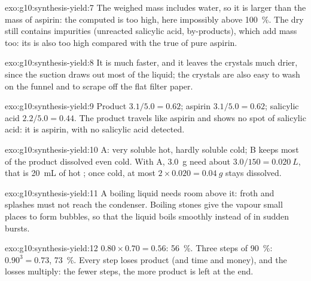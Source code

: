 \begin{solution}{exo:g10:synthesis-yield:7}
The weighed mass includes water, so it is larger than the mass of
aspirin: the computed  is too high, here impossibly above
\qty{100}{\percent}. The dry  still contains impurities
(unreacted salicylic acid, by-products), which add mass too: its 
is also too high compared with the true  of pure aspirin.
\end{solution}

\begin{solution}{exo:g10:synthesis-yield:8}
It is much faster, and it leaves the crystals much drier, since the
suction draws out most of the liquid; the crystals are also easy to wash
on the funnel and to scrape off the flat filter paper.
\end{solution}

\begin{solution}{exo:g10:synthesis-yield:9}
Product $3.1/5.0 = 0.62$; aspirin $3.1/5.0 = 0.62$; salicylic acid
$2.2/5.0 = 0.44$. The product travels like aspirin and shows no spot of
salicylic acid: it is aspirin, with no salicylic acid detected.
\end{solution}

\begin{solution}{exo:g10:synthesis-yield:10}
 A: very soluble hot, hardly soluble cold;  B keeps most of
the product dissolved even cold. With A, \qty{3.0}{g} need about
$3.0 / 150 = \qty{0.020}{L}$, that is \qty{20}{mL} of hot ; once
cold, at most $2 \times 0.020 = \qty{0.04}{g}$ stays dissolved.
\end{solution}

\begin{solution}{exo:g10:synthesis-yield:11}
A boiling liquid needs room above it: froth and splashes must not reach
the condenser. Boiling stones give the vapour small places to form
bubbles, so that the liquid boils smoothly instead of in sudden bursts.
\end{solution}

\begin{solution}{exo:g10:synthesis-yield:12}
$0.80 \times 0.70 = 0.56$: \qty{56}{\percent}. Three steps of
\qty{90}{\percent}: $0.90^3 = 0.73$, \qty{73}{\percent}. Every step
loses product (and time and money), and the losses multiply: the fewer
steps, the more product is left at the end.
\end{solution}

